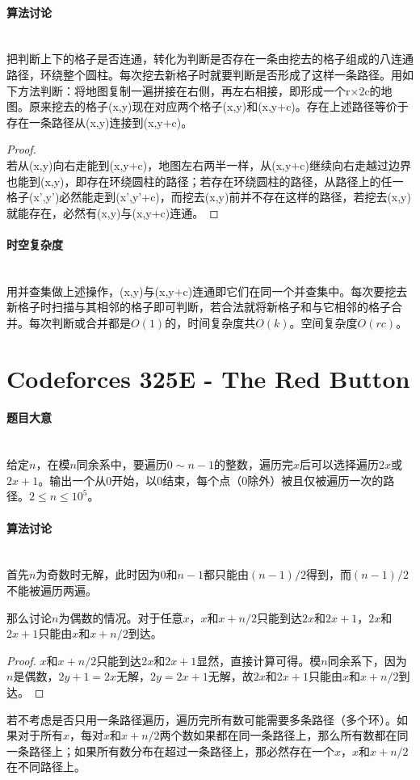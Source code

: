 \documentclass[UTF8]{ctexart}
\newcommand{\myparagraph}[1]{\paragraph{#1}\mbox{}\\}
\theoremstyle{nonumberplain}
\newtheorem{proof}{\hspace{1em}证明：}
\begin{document}
		\myparagraph{算法讨论}
		
			把判断上下的格子是否连通，转化为判断是否存在一条由挖去的格子组成的八连通路径，环绕整个圆柱。每次挖去新格子时就要判断是否形成了这样一条路径。用如下方法判断：将地图复制一遍拼接在右侧，再左右相接，即形成一个r×2c的地图。原来挖去的格子(x,y)现在对应两个格子(x,y)和(x,y+c)。存在上述路径等价于存在一条路径从(x,y)连接到(x,y+c)。
			
			\begin{proof}\mbox{}\\
			
				若从(x,y)向右走能到(x,y+c)，地图左右两半一样，从(x,y+c)继续向右走越过边界也能到(x,y)，即存在环绕圆柱的路径；若存在环绕圆柱的路径，从路径上的任一格子(x',y')必然能走到(x',y'+c)，而挖去(x,y)前并不存在这样的路径，若挖去(x,y)就能存在，必然有(x,y)与(x,y+c)连通。
			
			\end{proof}
		
		\myparagraph{时空复杂度}
		
			用并查集做上述操作，(x,y)与(x,y+c)连通即它们在同一个并查集中。每次要挖去新格子时扫描与其相邻的格子即可判断，若合法就将新格子和与它相邻的格子合并。每次判断或合并都是$O(1)$的，时间复杂度共$O(k)$。空间复杂度$O(rc)$。
	
	\section{Codeforces 325E - The Red Button}
	
		\myparagraph{题目大意}
		
			给定$n$，在模$n$同余系中，要遍历$0 \sim n-1$的整数，遍历完$x$后可以选择遍历$2x$或$2x+1$。输出一个从0开始，以0结束，每个点（0除外）被且仅被遍历一次的路径。$2 \leq n \leq 10^5$。
		
		\myparagraph{算法讨论}
		
			首先$n$为奇数时无解，此时因为0和$n-1$都只能由$(n-1)/2$得到，而$(n-1)/2$不能被遍历两遍。
			
			那么讨论$n$为偶数的情况。对于任意$x$，$x$和$x+n/2$只能到达$2x$和$2x+1$，$2x$和$2x+1$只能由$x$和$x+n/2$到达。
			
			\begin{proof} $x$和$x+n/2$只能到达$2x$和$2x+1$显然，直接计算可得。模$n$同余系下，因为$n$是偶数，$2y+1=2x$无解，$2y=2x+1$无解，故$2x$和$2x+1$只能由$x$和$x+n/2$到达。 \end{proof}
			
			若不考虑是否只用一条路径遍历，遍历完所有数可能需要多条路径（多个环）。如果对于所有$x$，每对$x$和$x+n/2$两个数如果都在同一条路径上，那么所有数都在同一条路径上；如果所有数分布在超过一条路径上，那必然存在一个$x$，$x$和$x+n/2$在不同路径上。
			
\end{document}
